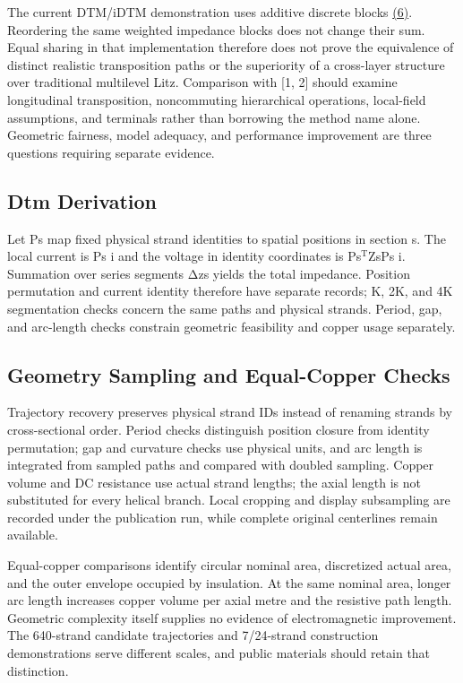 \documentclass[journal,10pt]{IEEEtran}
\begin{document}
The current DTM/iDTM demonstration uses additive discrete blocks \href{report_en_ieee.pdf#E06}{(6)}. Reordering the same weighted impedance blocks does not change their sum. Equal sharing in that implementation therefore does not prove the equivalence of distinct realistic transposition paths or the superiority of a cross-layer structure over traditional multilevel Litz. Comparison with [1, 2] should examine longitudinal transposition, noncommuting hierarchical operations, local-field assumptions, and terminals rather than borrowing the method name alone. Geometric fairness, model adequacy, and performance improvement are three questions requiring separate evidence.


\subsection*{Dtm Derivation}
\hypertarget{05.dtm_derivation.heading}{}
Let Ps map fixed physical strand identities to spatial positions in section s. The local current is Ps i and the voltage in identity coordinates is Ps\(^{\mathrm T}\)ZsPs i. Summation over series segments Δzs yields the total impedance. Position permutation and current identity therefore have separate records; K, 2K, and 4K segmentation checks concern the same paths and physical strands. Period, gap, and arc-length checks constrain geometric feasibility and copper usage separately.


\subsection*{Geometry Sampling and Equal-Copper Checks}
\hypertarget{05.report_geometry.heading}{}
Trajectory recovery preserves physical strand IDs instead of renaming strands by cross-sectional order. Period checks distinguish position closure from identity permutation; gap and curvature checks use physical units, and arc length is integrated from sampled paths and compared with doubled sampling. Copper volume and DC resistance use actual strand lengths; the axial length is not substituted for every helical branch. Local cropping and display subsampling are recorded under the publication run, while complete original centerlines remain available.


Equal-copper comparisons identify circular nominal area, discretized actual area, and the outer envelope occupied by insulation. At the same nominal area, longer arc length increases copper volume per axial metre and the resistive path length. Geometric complexity itself supplies no evidence of electromagnetic improvement. The 640-strand candidate trajectories and 7/24-strand construction demonstrations serve different scales, and public materials should retain that distinction.
\end{document}
